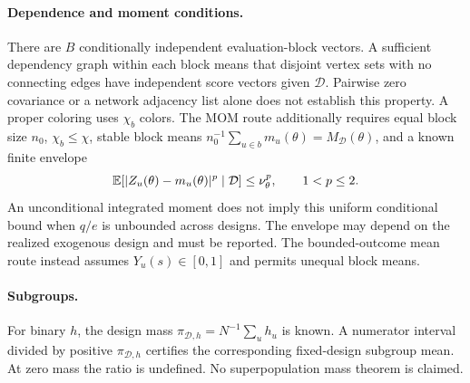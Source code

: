\paragraph{Dependence and moment conditions.}
There are $B$ conditionally independent evaluation-block vectors. A sufficient dependency graph within each block means that disjoint vertex sets with no connecting edges have independent score vectors given $\mathcal D$. Pairwise zero covariance or a network adjacency list alone does not establish this property. A proper coloring uses $\chi_b$ colors. The MOM route additionally requires equal block size $n_0$, $\chi_b\le\chi$, stable block means $n_0^{-1}\sum_{u\in b}m_u(\theta)=M_{\mathcal D}(\theta)$, and a known finite envelope
\begin{equation}
 \mathbb{E}[|Z_u(\theta)-m_u(\theta)|^p\mid\mathcal D]\le\nu_\theta^p,
 \qquad 1<p\le2.
 \label{eq:gate-a-moment}
\end{equation}
An unconditional integrated moment does not imply this uniform conditional bound when $q/e$ is unbounded across designs. The envelope may depend on the realized exogenous design and must be reported. The bounded-outcome mean route instead assumes $Y_u(s)\in[0,1]$ and permits unequal block means.

\paragraph{Subgroups.}
For binary $h$, the design mass $\pi_{\mathcal D,h}=N^{-1}\sum_u h_u$ is known. A numerator interval divided by positive $\pi_{\mathcal D,h}$ certifies the corresponding fixed-design subgroup mean. At zero mass the ratio is undefined. No superpopulation mass theorem is claimed.
